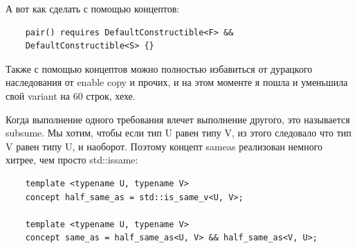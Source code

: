 \documentclass[12pt, a4paper]{article}
\begin{document}
А вот как сделать с помощью концептов:
\begin{verbatim}
	pair() requires DefaultConstructible<F> &&
	DefaultConstructible<S> {}
\end{verbatim}
Также с помощью концептов можно полностью избавиться от дурацкого наследования от enable copy и прочих, и на этом моменте я пошла и уменьшила свой variant на 60 строк, хехе.
\par Когда выполнение одного требования влечет выполнение другого, это называется subsume. Мы хотим, чтобы если тип U равен типу V, из этого следовало что тип V равен типу U, и наоборот. Поэтому концепт same\textunderscore as реализован немного хитрее, чем просто std::is\textunderscore same:
\begin{verbatim}
	template <typename U, typename V>
	concept half_same_as = std::is_same_v<U, V>;
	
	template <typename U, typename V>
	concept same_as = half_same_as<U, V> && half_same_as<V, U>;
\end{verbatim}
\end{document}
